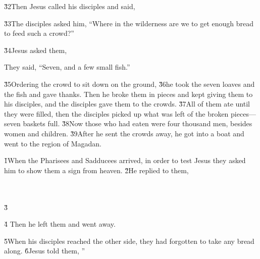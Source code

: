 \v{32}Then Jesus called his disciples and said, 

\v{33}The disciples asked him, ``Where in the wilderness are we to get enough bread to feed such a crowd?''

\v{34}Jesus asked them, 

They said, ``Seven, and a few small fish.''

\v{35}Ordering the crowd to sit down on the ground, \v{36}he took the seven loaves and the fish and gave thanks. Then he broke them in pieces and kept giving them to his disciples, and the disciples gave them to the crowds. \v{37}All of them ate until they were filled, then the disciples picked up what was left of the broken pieces---seven baskets full. \v{38}Now those who had eaten were four thousand men, besides women and children. \v{39}After he sent the crowds away, he got into a boat and went to the region of Magadan.

\v{1}When the Pharisees and Sadducees arrived, in order to test Jesus they asked him to show them a sign from heaven. \v{2}He replied to them, 

\begin{poetry}
\poeml {} \\
\poemll    {} \\
\poeml \v{3} \\
\poemll    {}
\end{poetry}

 \v{4} Then he left them and went away.

\v{5}When his disciples reached the other side, they had forgotten to take any bread along. \v{6}Jesus told them, ''

